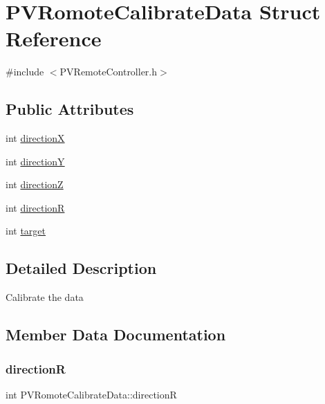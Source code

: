 \hypertarget{struct_p_v_romote_calibrate_data}{}\section{P\+V\+Romote\+Calibrate\+Data Struct Reference}
\label{struct_p_v_romote_calibrate_data}


{\ttfamily \#include $<$P\+V\+Remote\+Controller.\+h$>$}

\subsection*{Public Attributes}
\begin{DoxyCompactItemize}
\item 
int \hyperlink{struct_p_v_romote_calibrate_data_a8c6eba10e91313faf602f4b95d61c118}{directionX}
\item 
int \hyperlink{struct_p_v_romote_calibrate_data_ac4a15dac848d93b20f5ff0aeca41e67f}{directionY}
\item 
int \hyperlink{struct_p_v_romote_calibrate_data_a398c0488311ba14027daa9752e0575db}{directionZ}
\item 
int \hyperlink{struct_p_v_romote_calibrate_data_aa7a6d676f3a3e8d65e21d0521014b6d7}{directionR}
\item 
int \hyperlink{struct_p_v_romote_calibrate_data_a4b9f96ea8998c5507339f28ab322cd23}{target}
\end{DoxyCompactItemize}


\subsection{Detailed Description}
Calibrate the data 

\subsection{Member Data Documentation}
\mbox{\label{struct_p_v_romote_calibrate_data_aa7a6d676f3a3e8d65e21d0521014b6d7}} 
\subsubsection{\texorpdfstring{directionR}{directionR}}
{\footnotesize\ttfamily int P\+V\+Romote\+Calibrate\+Data\+::directionR}


